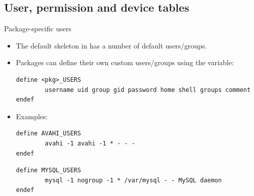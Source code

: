 \subsection{User, permission and device tables}

\begin{frame}[fragile]{Package-specific users}

\begin{itemize}

\item The default skeleton in  has a number of
  default users/groups.
\item Packages can define their own custom users/groups using the
   variable:
{\footnotesize
  \begin{block}{}
\begin{verbatim}
define <pkg>_USERS
        username uid group gid password home shell groups comment
endef
\end{verbatim}
  \end{block}}
\item Examples:
  \begin{block}{}
    \begin{verbatim}
define AVAHI_USERS
        avahi -1 avahi -1 * - - -
endef
\end{verbatim}
\end{block}

\begin{block}{}
  \begin{verbatim}
define MYSQL_USERS
        mysql -1 nogroup -1 * /var/mysql - - MySQL daemon
endef
  \end{verbatim}
\end{block}
\end{itemize}

\end{frame}

